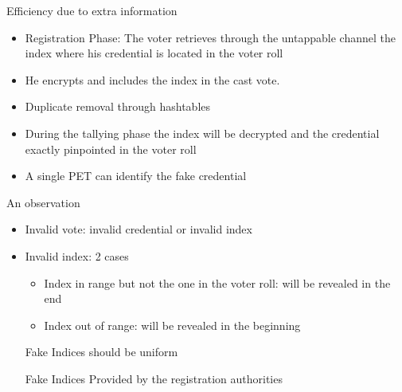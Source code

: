 \documentclass{beamer}
\begin{document}
\begin{frame}[allowframebreaks]{Efficiency due to extra information \cite{SpycherKHS11}}
 
\begin{itemize}
\item Registration Phase: The voter retrieves through the untappable channel the index where his credential is located in the voter roll
\item He encrypts and includes the index in the cast vote.
\item Duplicate removal through hashtables
\item During the tallying phase the index will be decrypted and the credential exactly pinpointed in the voter roll
\item A single PET can identify the fake credential
\end{itemize} 

\begin{block}{An observation}
\begin{itemize}
\item Invalid vote: invalid credential or invalid index
\item Invalid index: 2 cases
\begin{itemize}
\item Index in range but not the one in the voter roll: will be revealed in the end
\item Index out of range: will be revealed in the beginning
\end{itemize}

Fake Indices should be uniform

Fake Indices Provided by the registration authorities
\end{itemize} 
\end{block}
\end{frame}
\end{document}
